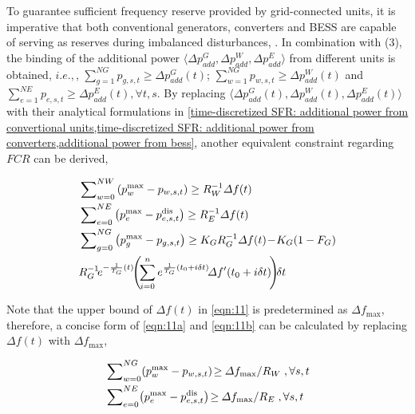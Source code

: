 \documentclass[lettersize,journal]{IEEEtran}
\newcommand{\slfrac}[2]{\left.#1\middle/#2\right.}
\newenvironment{newsubequations}{\small\begin{subequations}}{\end{subequations}}
\begin{document}
To guarantee sufficient frequency reserve provided by grid-connected units, it is imperative that both conventional generators, converters and BESS are capable of serving as reserves during imbalanced disturbances, \cite{zhang2020modeling,9964327}. In combination with (3), the binding of the additional power $\langle \varDelta p_{add}^{G}, \varDelta p_{add}^{W}, \varDelta p_{add}^{E}\rangle$ from different units is obtained, $i.e.,$, $\sum_{g=1}^{NG}\! p_{g, s, t}\!\geq\! \varDelta p_{add}^{G}(t)$;  $\sum_{w=1}^{NG}\! p_{w, s, t}\!\geq\! \varDelta p_{add}^{W}(t)$ and  $\sum_{e=1}^{NE}\! p_{e, s, t}\!\geq\! \varDelta p_{add}^{E}(t), \forall t, s$. By replacing $\langle\varDelta p_{add}^{G}(t), \varDelta p_{add}^{W}(t), \varDelta p_{add}^{E}(t)\rangle$ with their analytical formulations in \cref{time-discretized SFR: additional power from convertional units,time-discretized SFR: additional power from converters,additional power from bess}, another equivalent constraint regarding $FCR$ can be derived,

\vspace{-0.125in}
\begin{newsubequations}\label{eqn:11}
	\begin{align}
		 & \sum\nolimits_{w=0}^{NW} \left( p_{w}^{\text{max}} - p_{w, s, t} \right)\geq R_W^{-1}\varDelta f(t) \label{eqn:11a}                                                                  \\
		 & \sum\nolimits_{e=0}^{NE} \left( p_{e}^{\text{max}} -p_{e, s, t}^{\text{dis}}\right)\geq {R_E^{-1}}\varDelta f(t) \label{eqn:11b}                                                     \\
		 & \sum\nolimits_{g=0}^{NG} \left( p_{g}^{\text{max}} -p_{g, s, t}\right)\geq {K_{G} }{ R_{G}^{-1}} \varDelta f(t)\!-\! {K_G(1-F_G)}\notag                                              \\
		 & { R_{G}^{-1} }\!e^{-\frac{1}{T_G} (t)}\!\!\left(\!\sum_{i = 0}^{n}e^{\frac{1}{T_G}(t_0 + i \delta t)} \! \varDelta f^{\prime}(t_0 + i \delta t) \!\right)\!\!\delta t\label{eqn:11c}
	\end{align}
\end{newsubequations}

Note that the upper bound of $\varDelta f(t)$ in \eqref{eqn:11} is predetermined as $\varDelta f_{\text{max}}$, therefore, a concise form of \eqref{eqn:11a} and \eqref{eqn:11b} can be calculated by replacing $\varDelta f(t)$ with $\varDelta f_{\text{max}}$,

\vspace{-0.125in}
\begin{newsubequations}\label{eqn:12}
	\begin{align}
		 & \sum\nolimits_{w=0}^{NG}\!\left( p_{w}^{\text{max}} - p_{w, s, t}\right)\!\geq \!\slfrac{\varDelta f_{\text{max}}}{R_W},\forall s,t                 \\
		 & \sum\nolimits_{e=0}^{NE} \! \left( p_{e}^{\text{max}} - p_{e, s, t}^{\text{dis}}\right)\!\geq \! \slfrac{\varDelta f_{\text{max}}}{R_E},\forall s,t
	\end{align}
\end{newsubequations}
\end{document}
